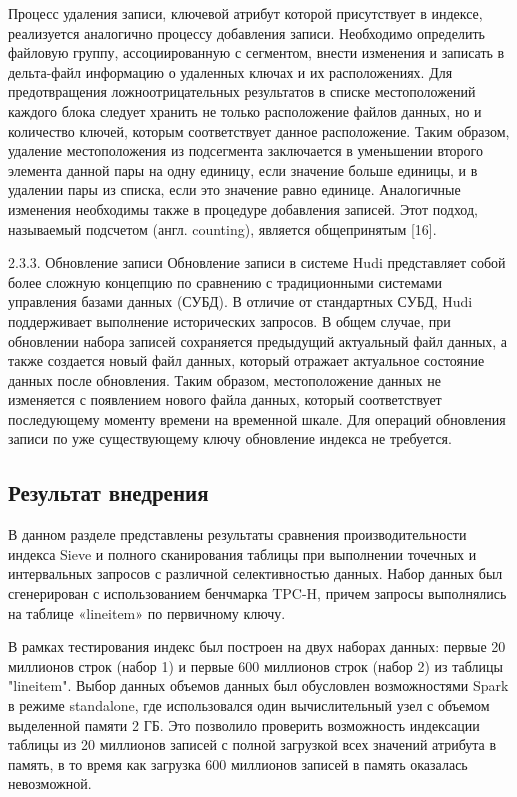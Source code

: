 Процесс удаления записи, ключевой атрибут которой присутствует в индексе, реализуется аналогично процессу добавления записи. Необходимо определить файловую группу, ассоциированную с сегментом, внести изменения и записать в дельта-файл информацию о удаленных ключах и их расположениях. Для предотвращения ложноотрицательных результатов в списке местоположений каждого блока следует хранить не только расположение файлов данных, но и количество ключей, которым соответствует данное расположение. Таким образом, удаление местоположения из подсегмента заключается в уменьшении второго элемента данной пары на одну единицу, если значение больше единицы, и в удалении пары из списка, если это значение равно единице. Аналогичные изменения необходимы также в процедуре добавления записей. Этот подход, называемый подсчетом (англ. counting), является общепринятым [16].

2.3.3. Обновление записи
Обновление записи в системе Hudi представляет собой более сложную концепцию по сравнению с традиционными системами управления базами данных (СУБД). В отличие от стандартных СУБД, Hudi поддерживает выполнение исторических запросов. В общем случае, при обновлении набора записей сохраняется предыдущий актуальный файл данных, а также создается новый файл данных, который отражает актуальное состояние данных после обновления. Таким образом, местоположение данных не изменяется с появлением нового файла данных, который соответствует последующему моменту времени на временной шкале. Для операций обновления записи по уже существующему ключу обновление индекса не требуется.

\subsection{Результат внедрения}
В данном разделе представлены результаты сравнения производительности индекса Sieve и полного сканирования таблицы при выполнении точечных и интервальных запросов с различной селективностью данных. Набор данных был сгенерирован с использованием бенчмарка TPC-H, причем запросы выполнялись на таблице «lineitem» по первичному ключу.

В рамках тестирования индекс был построен на двух наборах данных: первые 20 миллионов строк (набор 1) и первые 600 миллионов строк (набор 2) из таблицы "lineitem". Выбор данных объемов данных был обусловлен возможностями Spark в режиме standalone, где использовался один вычислительный узел с объемом выделенной памяти 2 ГБ. Это позволило проверить возможность индексации таблицы из 20 миллионов записей с полной загрузкой всех значений атрибута в память, в то время как загрузка 600 миллионов записей в память оказалась невозможной.

